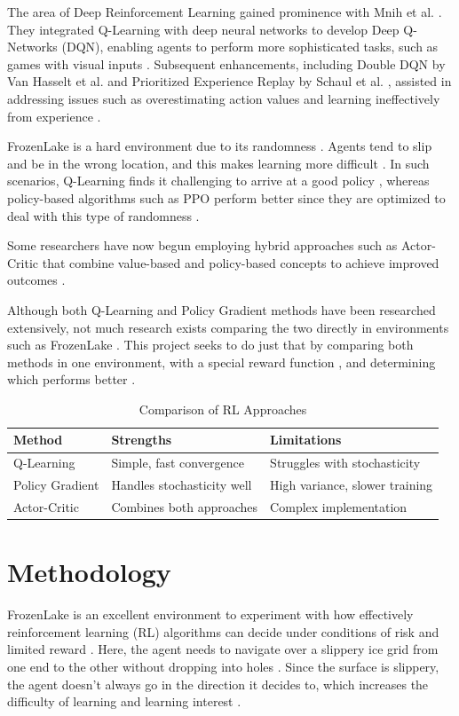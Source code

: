 \documentclass[conference]{IEEEtran}
\begin{document}
The area of Deep Reinforcement Learning gained prominence with Mnih et al. \cite{Mnih2015}. They integrated Q-Learning with deep neural networks to develop Deep Q-Networks (DQN), enabling agents to perform more sophisticated tasks, such as games with visual inputs \cite{Mnih2015}. Subsequent enhancements, including Double DQN by Van Hasselt et al. \cite{van2016} and Prioritized Experience Replay by Schaul et al. \cite{schaul2015}, assisted in addressing issues such as overestimating action values and learning ineffectively from experience \cite{Thomas2016}.

FrozenLake is a hard environment due to its randomness \cite{Brockman2016}. Agents tend to slip and be in the wrong location, and this makes learning more difficult \cite{SuttonBarto2018}. In such scenarios, Q-Learning finds it challenging to arrive at a good policy \cite{Watkins1992}, whereas policy-based algorithms such as PPO perform better since they are optimized to deal with this type of randomness \cite{Schulman2015}.

Some researchers have now begun employing hybrid approaches such as Actor-Critic that combine value-based and policy-based concepts to achieve improved outcomes \cite{Degris2012}.

Although both Q-Learning \cite{Watkins1992} and Policy Gradient methods \cite{Williams1992} have been researched extensively, not much research exists comparing the two directly in environments such as FrozenLake \cite{Brockman2016}. This project seeks to do just that by comparing both methods in one environment, with a special reward function \cite{Ng1999}, and determining which performs better \cite{Henderson2018}.

\begin{table}[h]
\centering
\caption{Comparison of RL Approaches \cite{SuttonBarto2018}}
\label{tab:lit_review}
\begin{tabular}{@{}lll@{}}
\toprule
\textbf{Method} & \textbf{Strengths} & \textbf{Limitations} \\ \midrule
Q-Learning & Simple, fast convergence & Struggles with stochasticity \\
Policy Gradient & Handles stochasticity well & High variance, slower training \\
Actor-Critic & Combines both approaches & Complex implementation \\ \bottomrule
\end{tabular}
\end{table}

\section{Methodology}
FrozenLake is an excellent environment to experiment with how effectively reinforcement learning (RL) algorithms can decide under conditions of risk and limited reward \cite{Brockman2016}. Here, the agent needs to navigate over a slippery ice grid from one end to the other without dropping into holes \cite{SuttonBarto2018}. Since the surface is slippery, the agent doesn't always go in the direction it decides to, which increases the difficulty of learning and learning interest \cite{Littman1996}.
\end{document}

